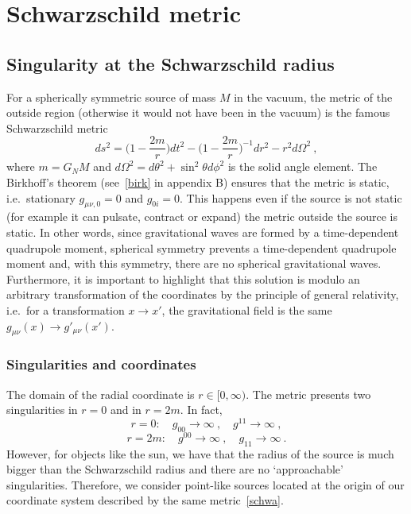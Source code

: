 \part{Schwarzschild metric}

\chapter{Singularity at the Schwarzschild radius}

    For a spherically symmetric source of mass $M$ in the vacuum, the metric of the outside region (otherwise it would not have been in the vacuum) is the famous Schwarzschild metric 
    \begin{equation}\label{schwa}
        ds^2 = \Big ( 1 - \frac{2m}{r} \Big ) dt^2 - \Big ( 1 - \frac{2m}{r} \Big)^{-1} dr^2 - r^2 d\Omega^2 ~, 
    \end{equation}
    where $m = G_N M$ and $d\Omega^2 = d\theta^2 + \sin^2 \theta d\phi^2$ is the solid angle element. The Birkhoff's theorem (see~\ref{birk} in appendix B) ensures that the metric is static, i.e.~stationary $g_{\mu\nu,0} = 0$ and $g_{0i} = 0$. This happens even if the source is not static (for example it can pulsate, contract or expand) the metric outside the source is static. In other words, since gravitational waves are formed by a time-dependent quadrupole moment, spherical symmetry prevents a time-dependent quadrupole moment and, with this symmetry, there are no spherical gravitational waves. Furthermore, it is important to highlight that this solution is modulo an arbitrary transformation of the coordinates by the principle of general relativity, i.e.~for a transformation $x \rightarrow x'$, the gravitational field is the same $g_{\mu\nu} (x) \rightarrow g'_{\mu\nu} (x')$.

\section{Singularities and coordinates}

    The domain of the radial coordinate is $r \in [0, \infty)$. The metric presents two singularities in $r = 0$ and in $r = 2m$. In fact, 
    \begin{equation*}
        r = 0 : \quad g_{00} \rightarrow \infty ~, \quad g^{11} \rightarrow \infty ~,
    \end{equation*}
    \begin{equation*}
        r = 2m : \quad g^{00} \rightarrow \infty ~, \quad g_{11} \rightarrow \infty ~.
    \end{equation*}
    However, for objects like the sun, we have that the radius of the source is much bigger than the Schwarzschild radius and there are no `approachable' singularities. Therefore, we consider point-like sources located at the origin of our coordinate system described by the same metric~\eqref{schwa}. 

